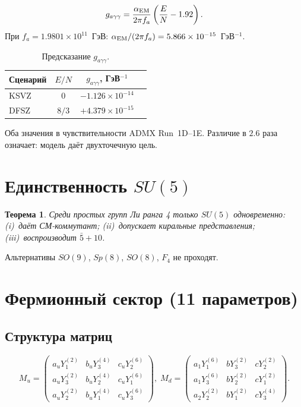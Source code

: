 \documentclass[12pt,a4paper]{article}
\numberwithin{equation}{section}
\newtheorem{theorem}{Теорема}[section]
\begin{document}
\begin{equation}
g_{a\gamma\gamma} = \frac{\alpha_{\rm EM}}{2\pi f_a}\left(\frac{E}{N} - 1.92\right).
\end{equation}
При $f_a = 1.9801\times10^{11}$~ГэВ:
$\alpha_{\rm EM}/(2\pi f_a) = 5.866\times10^{-15}$~ГэВ$^{-1}$.

\begin{table}[H]
\centering
\caption{Предсказание $g_{a\gamma\gamma}$.}
\begin{tabular}{lccc}
\toprule
Сценарий & $E/N$ & $g_{a\gamma\gamma}$, ГэВ$^{-1}$ \\
\midrule
KSVZ & $0$   & $-1.126\times10^{-14}$ \\
DFSZ & $8/3$ & $+4.379\times10^{-15}$ \\
\bottomrule
\end{tabular}
\end{table}

Оба значения в чувствительности ADMX Run~1D--1E.
Различие в $2.6$ раза означает: модель даёт двухточечную цель.

\section{Единственность $SU(5)$}

\begin{theorem}
Среди простых групп Ли ранга 4 только $SU(5)$ одновременно:
(i)~даёт СМ-коммутант; (ii)~допускает киральные представления;
(iii)~воспроизводит $\bar 5 + 10$.
\end{theorem}
Альтернативы $SO(9)$, $Sp(8)$, $SO(8)$, $F_4$ не проходят.

\section{Фермионный сектор (11 параметров)}
\label{sec:fermion}

\subsection{Структура матриц}

\begin{equation}
M_u = \begin{pmatrix}
a_u Y_1^{(2)} & b_u Y_3^{(4)} & c_u Y_2^{(6)} \\
a_u Y_3^{(2)} & b_u Y_2^{(4)} & c_u Y_1^{(6)} \\
a_u Y_2^{(2)} & b_u Y_1^{(4)} & c_u Y_3^{(6)}
\end{pmatrix}, \;
M_d = \begin{pmatrix}
a_1 Y_1^{(6)} & b Y_3^{(2)} & c Y_2^{(2)} \\
a_1 Y_3^{(6)} & b Y_2^{(2)} & c Y_1^{(2)} \\
a_2 Y_2^{(2)} & b Y_1^{(2)} & c Y_3^{(4)}
\end{pmatrix}.
\end{equation}
\end{document}

